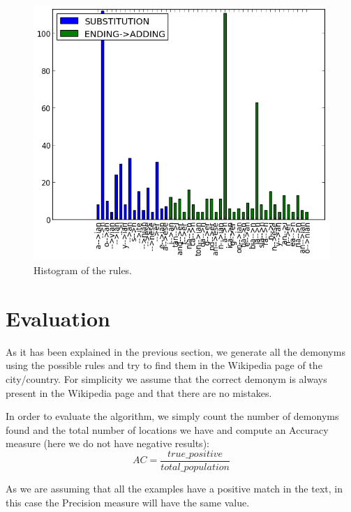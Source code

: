 \documentclass[]{report}
\begin{document}
\begin{figure}[htb!]
\centering
\includegraphics[scale=0.6]{img/rules}
\caption{Histogram of the rules.}
\label{Histogram of the rules.}
\end{figure}




\section{Evaluation}

As it has been explained in the previous section, we generate all the demonyms using the possible rules and try to find them in the Wikipedia page of the city/country. For simplicity we assume that the correct demonym is always present in the Wikipedia page and that there are no mistakes.

In order to evaluate the algorithm, we simply count the number of demonyms found and the total number of locations we have and compute an Accuracy measure (here we do not have negative results):
$$
AC = \frac{true\_positive}{total\_population}
$$

As we are assuming that all the examples have a positive match in the text, in this case the Precision measure will have the same value.
\end{document}
